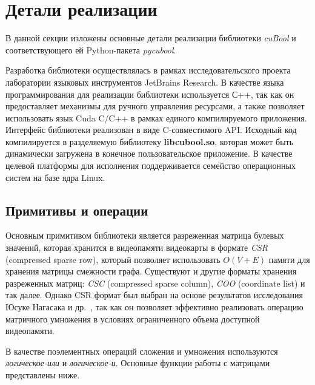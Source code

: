 \section{Детали реализации}

В данной секции изложены основные детали реализации библиотеки \textit{cuBool} и соответствующего ей Python-пакета \textit{pycubool}.

Разработка библиотеки осуществлялась в рамках исследовательского проекта лаборатории языковых инструментов JetBrains Research. В качестве языка программирования для реализации библиотеки используется С++, 
так как он предоставляет механизмы для ручного управления ресурсами, 
а также позволяет использовать язык Cuda C/C++ в рамках единого компилируемого приложения. 
Интерфейс библиотеки реализован в виде C-совместимого API.
Исходный код компилируется в разделяемую библиотеку \textbf{libcubool.so}, 
которая может быть динамически загружена в конечное пользовательское приложение. 
В качестве целевой платформы для исполнения поддерживается семейство операционных систем на базе ядра Linux.

\subsection{Примитивы и операции}

Основным примитивом библиотеки является разреженная матрица булевых значений, 
которая хранится в видеопамяти видеокарты в формате \textit{CSR} (compressed sparse row), 
который позволяет использовать $O(V + E)$ памяти для хранения матрицы смежности графа. 
Существуют и другие форматы хранения разреженных матриц: \textit{CSC} (compressed sparse column), \textit{COO} (coordinate list) и так далее. 
Однако CSR формат был выбран на основе результатов исследования Юсуке Нагасака и др.~\cite{inproceedings:spgemm_mem_saving_for_nvidia}, 
так как он позволяет эффективно реализовать операцию матричного умножения в условиях ограниченного объема доступной видеопамяти. 

В качестве поэлементных операций сложения и умножения используются \textit{логическое-или} и \textit{логическое-и}. 
Основные функции работы с матрицами представлены ниже.

